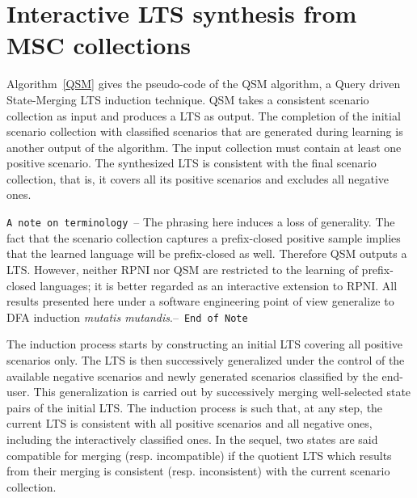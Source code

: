 \section{Interactive LTS synthesis from MSC collections\label{section:lts-induction-from-mscs}}

Algorithm~\ref{QSM} gives the pseudo-code of the \textsc{QSM} algorithm, a Query driven State-Merging LTS induction technique. \textsc{QSM} takes a consistent scenario collection as input and produces a LTS as output. The completion of the initial scenario collection with classified scenarios that are generated during learning is another output of the algorithm. The input collection must contain at least one positive scenario. The synthesized LTS is consistent with the final scenario collection, that is, it covers all its positive scenarios and excludes all negative ones.

\texttt{A note on terminology}~-- The phrasing here induces a loss of generality. The fact that the scenario collection captures a prefix-closed positive sample implies that the learned language will be prefix-closed as well. Therefore QSM outputs a LTS. However, neither RPNI nor QSM are restricted to the learning of prefix-closed languages; it is better regarded as an interactive extension to RPNI. All results presented here under a software engineering point of view generalize to DFA induction \emph{mutatis mutandis}.--~\texttt{End of Note}

The induction process starts by constructing an initial LTS covering all positive scenarios only. The LTS is then successively generalized under the control of the available negative scenarios and newly generated scenarios classified by the end-user. This generalization is carried out by successively merging well-selected state pairs of the initial LTS. The induction process is such that, at any step, the current LTS is consistent with all positive scenarios and all negative ones, including the interactively classified ones. In the sequel, two states are said compatible for merging (resp. incompatible) if the quotient LTS which results from their merging is consistent (resp. inconsistent) with the current scenario collection.

